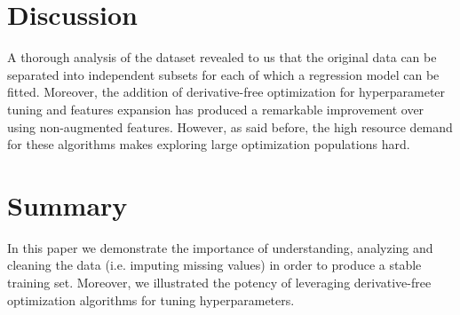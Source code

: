 \documentclass[10pt,conference,compsocconf]{IEEEtran}
\begin{document}
\section{Discussion}
A thorough analysis of the dataset revealed to us that the original data can be separated into independent subsets for each of which a regression model can be fitted. Moreover, the addition of derivative-free optimization for hyperparameter tuning and features expansion has produced a remarkable improvement over using non-augmented features. However, as said before, the high resource demand for these algorithms makes exploring large optimization populations hard.
\section{Summary}
In this paper we demonstrate the importance of understanding, analyzing and cleaning the data (i.e. imputing missing values) in order to produce a stable training set. Moreover, we illustrated the potency of leveraging derivative-free optimization algorithms for tuning hyperparameters.





\end{document}
